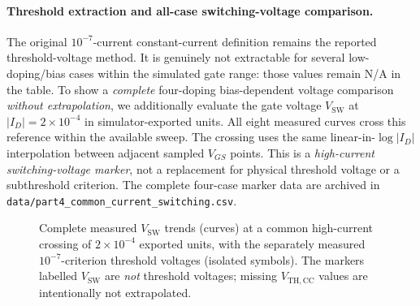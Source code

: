 \paragraph{Threshold extraction and all-case switching-voltage comparison.}
The original $10^{-7}$-current constant-current definition remains the
reported threshold-voltage method. It is genuinely not extractable
for several low-doping/bias cases within the simulated gate range:
those values remain N/A in the table. To show a \emph{complete}
four-doping bias-dependent voltage comparison \emph{without extrapolation},
we additionally evaluate the gate voltage $V_{\mathrm{SW}}$ at
$|I_D|=2\times10^{-4}$ in simulator-exported units. All eight
measured curves cross this reference within the available sweep.
The crossing uses the same linear-in-$\log|I_D|$ interpolation
between adjacent sampled $V_{GS}$ points. This is a
\emph{high-current switching-voltage marker}, not a replacement
for physical threshold voltage or a subthreshold criterion.
The complete four-case marker data are archived in
\texttt{data/part4\_common\_current\_switching.csv}.
\begin{figure}[!htbp]\centering
{}
\caption{Complete measured $V_{\mathrm{SW}}$ trends (curves)
at a common high-current crossing of $2\times10^{-4}$ exported
units, with the separately measured $10^{-7}$-criterion
threshold voltages (isolated symbols). The markers labelled
$V_{\mathrm{SW}}$ are \emph{not} threshold voltages; missing
$V_{\mathrm{TH,CC}}$ values are intentionally not extrapolated.}
\end{figure}

